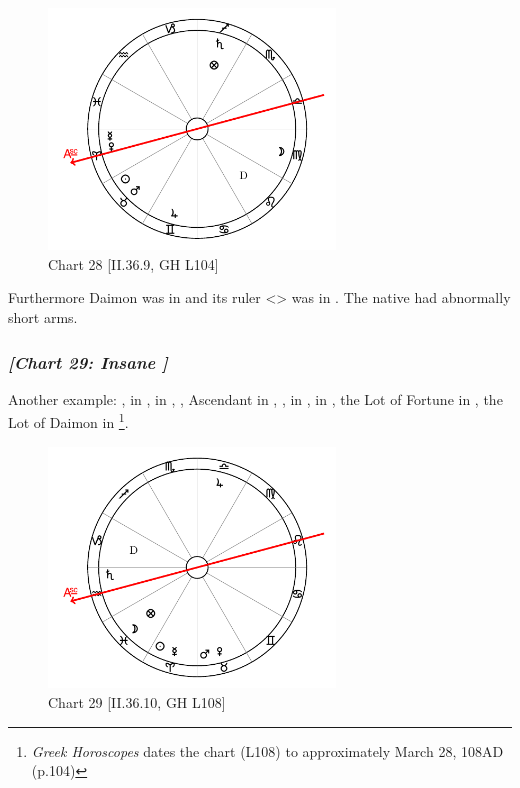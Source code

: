 \clearpage
\begin{figure}
\centering
\vspace{-20pt}
\includegraphics[width=0.68\textwidth]{charts/2_36_9}
\caption{Chart 28 [II.36.9, GH L104]}
\label{fig:chart28}
\end{figure}

Furthermore Daimon was in \Leo\xspace and its ruler <\Sun> was in \Taurus. The native had abnormally short arms.

\newpage
\subsubsection{\textit{[Chart 29: Insane ]}}
Another example: \Sun, \Mercury\xspace in \Aries, \Moon\xspace in \Pisces, \Saturn, Ascendant in \Aquarius, \Mars, \Venus\xspace in \Taurus, \Jupiter\xspace in \Libra, the Lot of Fortune in \Pisces, the Lot of Daimon in \Capricorn
\footnote{\textit{Greek Horoscopes} dates the chart (L108) to approximately March 28, 108AD (p.104)}.

\clearpage
\begin{figure}
\centering
\vspace{-20pt}
\includegraphics[width=0.68\textwidth]{charts/2_36_10}
\caption{Chart 29 [II.36.10, GH L108]}
\label{fig:chart29}
\end{figure}

